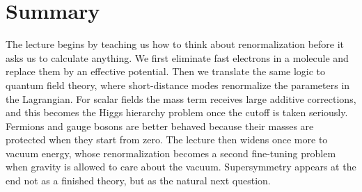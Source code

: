 \section{Summary}

The lecture begins by teaching us how to think about renormalization before it asks us to calculate anything. We first eliminate fast electrons in a molecule and replace them by an effective potential. Then we translate the same logic to quantum field theory, where short-distance modes renormalize the parameters in the Lagrangian. For scalar fields the mass term receives large additive corrections, and this becomes the Higgs hierarchy problem once the cutoff is taken seriously. Fermions and gauge bosons are better behaved because their masses are protected when they start from zero. The lecture then widens once more to vacuum energy, whose renormalization becomes a second fine-tuning problem when gravity is allowed to care about the vacuum. Supersymmetry appears at the end not as a finished theory, but as the natural next question.